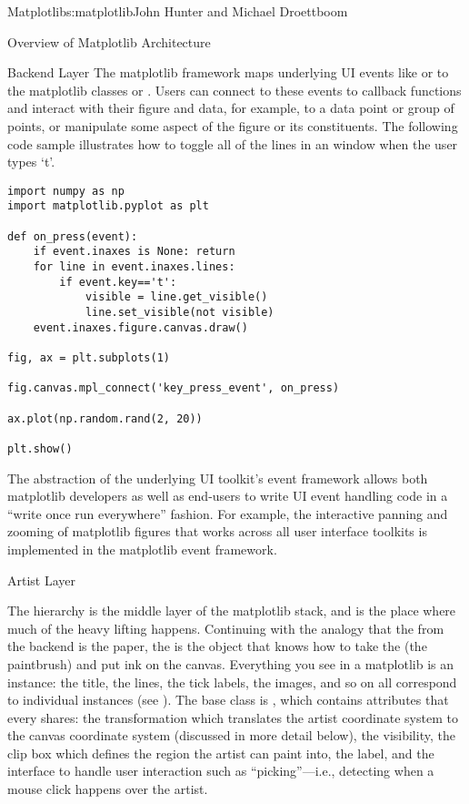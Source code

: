 \begin{aosachapter}{Matplotlib}{s:matplotlib}{John Hunter and Michael Droettboom}
\begin{aosasect1}{Overview of Matplotlib Architecture}
\begin{aosasect2}{Backend Layer}
The matplotlib  framework maps underlying UI events like
 or  to the
matplotlib classes  or .
Users can connect to these events to callback functions and
interact with their figure and data, for example, to 
a data point or group of points, or manipulate some aspect of the 
figure or its constituents.  The following code sample illustrates
how to toggle all of the lines in an  window when the
user types `t'.

\begin{verbatim}
import numpy as np
import matplotlib.pyplot as plt

def on_press(event):
    if event.inaxes is None: return
    for line in event.inaxes.lines:
        if event.key=='t':
            visible = line.get_visible()
            line.set_visible(not visible)
    event.inaxes.figure.canvas.draw()

fig, ax = plt.subplots(1)

fig.canvas.mpl_connect('key_press_event', on_press)

ax.plot(np.random.rand(2, 20))

plt.show()
\end{verbatim}

The abstraction of the underlying UI toolkit's event framework allows
both matplotlib developers as well as end-users to write UI event
handling code in a ``write once run everywhere'' fashion. For example,
the interactive panning and zooming of matplotlib figures that works
across all user interface toolkits is implemented in the matplotlib
event framework.

\end{aosasect2}

\begin{aosasect2}{Artist Layer}

The  hierarchy is the middle layer of the matplotlib
stack, and is the place where much of the heavy lifting happens.
Continuing with the analogy that the  from the
backend is the paper, the  is the object that knows how
to take the  (the paintbrush) and put ink on the
canvas.  Everything you see in a matplotlib  is an
 instance: the title, the lines, the tick labels, the
images, and so on all correspond to individual  instances
(see ).  The base class is
, which contains attributes that every
 shares: the transformation which translates the artist
coordinate system to the canvas coordinate system (discussed in more
detail below), the visibility, the clip box which defines the region
the artist can paint into, the label, and the interface to handle user
interaction such as ``picking''---i.e., detecting when a mouse click
happens over the artist.


\end{aosasect2}
\end{aosasect1}
\end{aosachapter}

